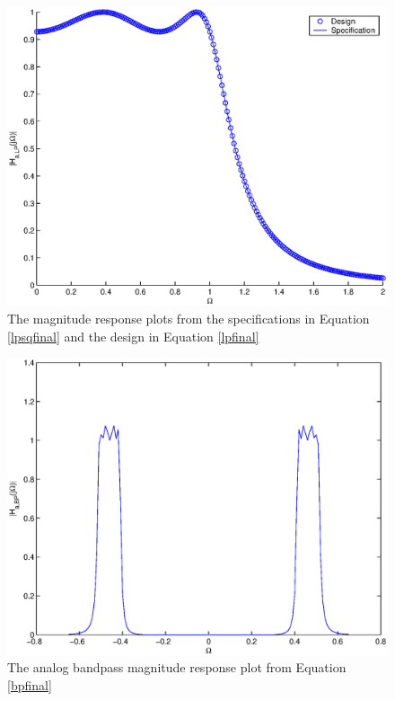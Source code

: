 \documentclass{article}
\begin{document}
\begin{figure}
\includegraphics[width = \columnwidth]{filtdesign/writeup/figs/fig2.eps}
\caption{The magnitude response plots from the specifications in Equation \ref{lpsqfinal} and the design in Equation \ref{lpfinal}}
	\label{filtdesign/writeup/figs/fig2}
\end{figure}

\begin{figure}
\includegraphics[width = \columnwidth]{filtdesign/writeup/figs/fig3.eps}
\caption{The analog bandpass magnitude response plot from Equation \ref{bpfinal}} 
	\label{filtdesign/writeup/figs/fig3}
\end{figure}
\end{document}
